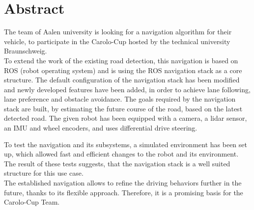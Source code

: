 \chapter*{Abstract}
\label{abstract}

The team of Aalen university is looking for a navigation algorithm for their vehicle, to participate in the Carolo-Cup hosted by the technical university Braunschweig.\\

To extend the work of the existing road detection, this navigation is based on ROS (robot operating system) and is using the ROS navigation stack as a core structure. The default configuration of the navigation stack has been modified and newly developed features have been added, in order to achieve lane following, lane preference and obstacle avoidance.
The goals required by the navigation stack are built, by estimating the future course of the road, based on the latest detected road.
The given robot has been equipped with a camera, a lidar sensor, an IMU and wheel encoders, and uses differential drive steering.

To test the navigation and its subsystems, a simulated environment has been set up, which allowed fast and efficient changes to the robot and its environment.\\

The result of these tests suggests, that the navigation stack is a well suited structure for this use case.\\

The established navigation allows to refine the driving behaviors further  in the future, thanks to its flexible approach. Therefore, it is a promising basis for the Carolo-Cup Team.

